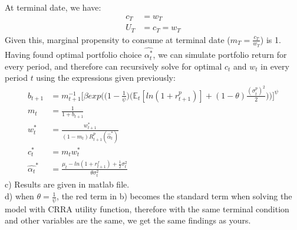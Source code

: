 \documentclass[12pt,a4paper]{article}
\begin{document}
At terminal date, we have:
\begin{align*}
    c_T&=w_T\\
    U_T&=c_T=w_T
\end{align*}
Given this, marginal propensity to consume at terminal date  \big($m_T=\frac{c_T}{w_T}$\big)  is 1. Having found optimal portfolio choice $ \hat{\alpha_t^*}$, we can simulate portfolio return for every period, and therefore can recursively solve for optimal $c_t$ and $w_t$ in every period $t$ using the expressions given previously:
\begin{align*}
    b_{t+1}&=m_{t+1}^{-1}\bigg[\beta  exp\bigg(\bigg(1-\frac{1}{\psi}\bigg)\bigg(\mathbb{E}_t[ln(1+r^p_{t+1})]+(1-\theta)\frac{(\sigma_t^p)^2}{2}\bigg)\bigg)\bigg]^{\psi}\\
    m_{t}&=\frac{1}{1+b_{t+1}}\\
    w_t^*&=\frac{w_{t+1}^*}{(1-m_t)R_{t+1}^p(\hat{\alpha}_t^*)}\\
    c_t^*&=m_tw_t^*\\
    \hat{\alpha_t}^{*}&=\frac{\mu_t-ln(1+r^f_{t+1})+\frac{1}{2}\sigma_t^2}{\theta\sigma_t^2}
\end{align*}
c) Results are given in matlab file.\\

d) when $\theta=\frac{1}{\psi}$, the red term in b) becomes the standard term when solving the model with CRRA utility function, therefore with the same terminal condition and other variables are the same, we get the same findings as yours.\\
\end{document}
